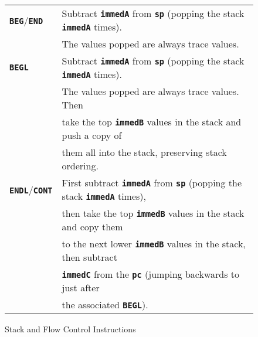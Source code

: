 \documentclass[12pt]{article}
\makeatletter
\newcommand{\TT}[1]{{\tt \bfseries #1}}
\newcommand{\ttkey}[1]{\TT{#1}\index{#1@{\tt #1}}}
\newlength{\figurewidth}
\newenvironment{boxedfigure}[1][!btp]%
	{\begin{figure*}[#1]
	 \begin{lrbox}{\figurebox}
	 \begin{minipage}{\figurewidth}

	 \vspace*{1ex}}%
	{
	 \vspace*{1ex}

	 \end{minipage}
	 \end{lrbox}

	 \centering
	 \fbox{\hspace*{0.1in}\usebox{\figurebox}\hspace*{0.1in}}
	 \end{figure*}}
\makeatother
\begin{document}
\begin{boxedfigure}
\begin{center}
\begin{tabular}{|l|l|}
\ttkey{BEG}/\ttkey{END}
    & Subtract \TT{immedA} from
      \TT{sp} (popping the stack \TT{immedA} times). \\
    & The values popped are always trace values.
\\\hline
\ttkey{BEGL}
    & Subtract \TT{immedA} from
      \TT{sp} (popping the stack \TT{immedA} times). \\
    & The values popped are always trace values.  Then \\
    & take the top \TT{immedB} values in the stack and push a copy of \\
    & them all into the stack, preserving stack ordering.
\\\hline
\ttkey{ENDL}/\ttkey{CONT}
    & First subtract \TT{immedA} from \TT{sp}
      (popping the stack \TT{immedA} times), \\
    & then take the top \TT{immedB} values in the stack and copy them \\
    & to the next lower \TT{immedB} values in the stack, then subtract \\
    & \TT{immedC} from the \TT{pc} (jumping backwards to just after \\
    & the associated \TT{BEGL}).
\\\hline
\end{tabular}
\end{center}
\vspace*{-3ex}
\caption{Stack and Flow Control Instructions}
\label{STACK-AND-FLOW-CONTROL-INSTRUCTIONS}
\end{boxedfigure}

\pagebreak
\end{document}

